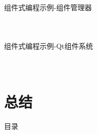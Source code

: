 \documentclass[UTF8,aspectratio=169]{beamer}
\begin{document}
\begin{frame}[fragile]{组件式编程示例-组件管理器}
    \begin{columns}
        \begin{column}{0.48\textwidth}
            \inputminted[firstline=24,lastline=40]{cpp}{code/component_programming_2.cpp}
        \end{column}
        \begin{column}{0.48\textwidth}
            \inputminted[firstline=41,lastline=55]{cpp}{code/component_programming_2.cpp}
        \end{column}
    \end{columns}
\end{frame}

\begin{frame}[fragile]{组件式编程示例-Qt组件系统}
    \begin{columns}
        \begin{column}{0.48\textwidth}
            \inputminted[firstline=7,lastline=23]{cpp}{code/component_programming_3.cpp}
        \end{column}
        \begin{column}{0.48\textwidth}
            \inputminted[firstline=24,lastline=43]{cpp}{code/component_programming_3.cpp}
        \end{column}
    \end{columns}
\end{frame}

\section{总结}
\begin{frame}{目录}
    \begin{multicols}{2}
        \tableofcontents[currentsection]
    \end{multicols}
\end{frame}
\end{document}
